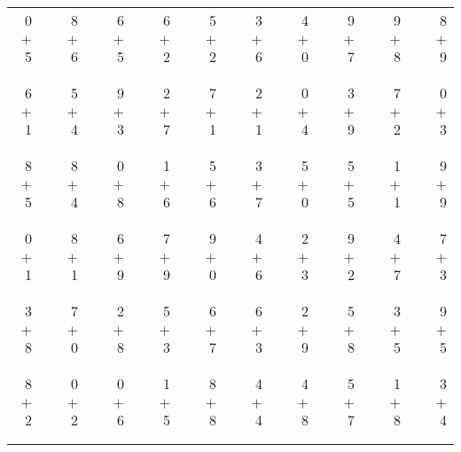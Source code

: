\documentclass[12pt, letterpaper]{article}
\begin{document}
\begin{tabular}{rrrrrrrrrrrrrrrrrrr}
0 & & 8 & & 6 & & 6 & & 5 & & 3 & & 4 & & 9 & & 9 & & 8\\
$+$ 5 & & $+$ 6 & & $+$ 5 & & $+$ 2 & & $+$ 2 & & $+$ 6 & & $+$ 0 & & $+$ 7 & & $+$ 8 & & $+$ 9\\
\cline{1-1} \cline{3-3} \cline{5-5} \cline{7-7} \cline{9-9} \cline{11-11} \cline{13-13} \cline{15-15} \cline{17-17} \cline{19-19} \\ \\
6 & & 5 & & 9 & & 2 & & 7 & & 2 & & 0 & & 3 & & 7 & & 0\\
$+$ 1 & & $+$ 4 & & $+$ 3 & & $+$ 7 & & $+$ 1 & & $+$ 1 & & $+$ 4 & & $+$ 9 & & $+$ 2 & & $+$ 3\\
\cline{1-1} \cline{3-3} \cline{5-5} \cline{7-7} \cline{9-9} \cline{11-11} \cline{13-13} \cline{15-15} \cline{17-17} \cline{19-19} \\ \\
8 & & 8 & & 0 & & 1 & & 5 & & 3 & & 5 & & 5 & & 1 & & 9\\
$+$ 5 & & $+$ 4 & & $+$ 8 & & $+$ 6 & & $+$ 6 & & $+$ 7 & & $+$ 0 & & $+$ 5 & & $+$ 1 & & $+$ 9\\
\cline{1-1} \cline{3-3} \cline{5-5} \cline{7-7} \cline{9-9} \cline{11-11} \cline{13-13} \cline{15-15} \cline{17-17} \cline{19-19} \\ \\
0 & & 8 & & 6 & & 7 & & 9 & & 4 & & 2 & & 9 & & 4 & & 7\\
$+$ 1 & & $+$ 1 & & $+$ 9 & & $+$ 9 & & $+$ 0 & & $+$ 6 & & $+$ 3 & & $+$ 2 & & $+$ 7 & & $+$ 3\\
\cline{1-1} \cline{3-3} \cline{5-5} \cline{7-7} \cline{9-9} \cline{11-11} \cline{13-13} \cline{15-15} \cline{17-17} \cline{19-19} \\ \\
3 & & 7 & & 2 & & 5 & & 6 & & 6 & & 2 & & 5 & & 3 & & 9\\
$+$ 8 & & $+$ 0 & & $+$ 8 & & $+$ 3 & & $+$ 7 & & $+$ 3 & & $+$ 9 & & $+$ 8 & & $+$ 5 & & $+$ 5\\
\cline{1-1} \cline{3-3} \cline{5-5} \cline{7-7} \cline{9-9} \cline{11-11} \cline{13-13} \cline{15-15} \cline{17-17} \cline{19-19} \\ \\
8 & & 0 & & 0 & & 1 & & 8 & & 4 & & 4 & & 5 & & 1 & & 3\\
$+$ 2 & & $+$ 2 & & $+$ 6 & & $+$ 5 & & $+$ 8 & & $+$ 4 & & $+$ 8 & & $+$ 7 & & $+$ 8 & & $+$ 4\\
\cline{1-1} \cline{3-3} \cline{5-5} \cline{7-7} \cline{9-9} \cline{11-11} \cline{13-13} \cline{15-15} \cline{17-17} \cline{19-19} \\ \\

\end{tabular}
\end{document}
